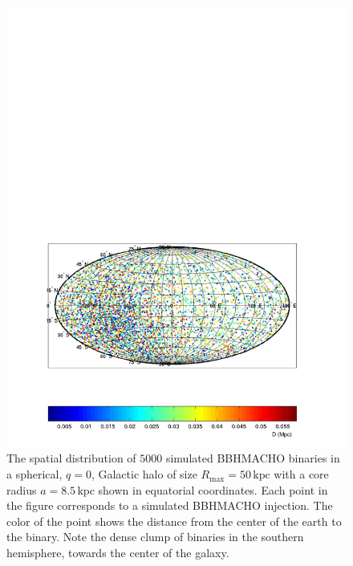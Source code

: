 \begin{figure}[p]
\begin{center}
\includegraphics[width=\linewidth]{figures/macho/spherical_equatorial}
\end{center}
\caption{\label{f:spherical_equatorial}%
The spatial distribution of $5000$ simulated BBHMACHO binaries in a spherical,
$q=0$, Galactic halo of size $R_\mathrm{max} = 50\,\mathrm{kpc}$ with a core
radius $a = 8.5\,\mathrm{kpc}$ shown in equatorial coordinates. Each point
in the figure corresponds to a simulated BBHMACHO injection. The color of the
point shows the distance from the center of the earth to the binary. Note the
dense clump of binaries in the southern hemisphere, towards the center of the
galaxy.
}
\end{figure}
